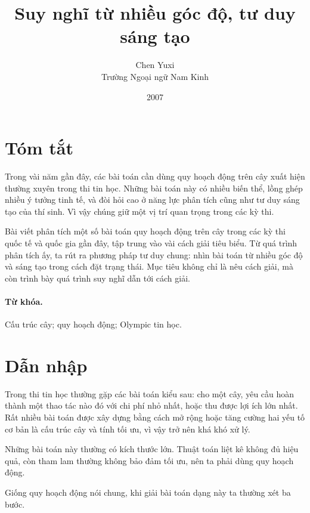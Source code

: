 \documentclass[11pt]{article}
\title{Suy nghĩ từ nhiều góc độ, tư duy sáng tạo}
\author{Chen Yuxi\\Trường Ngoại ngữ Nam Kinh}
\date{2007}
\begin{document}
\maketitle


\section*{Tóm tắt}

Trong vài năm gần đây, các bài toán cần dùng quy hoạch động trên cây xuất
hiện thường xuyên trong thi tin học. Những bài toán này có nhiều biến thể,
lồng ghép nhiều ý tưởng tinh tế, và đòi hỏi cao ở năng lực phân tích cũng như
tư duy sáng tạo của thí sinh. Vì vậy chúng giữ một vị trí quan trọng trong
các kỳ thi.

Bài viết phân tích một số bài toán quy hoạch động trên cây trong các kỳ thi
quốc tế và quốc gia gần đây, tập trung vào vài cách giải tiêu biểu. Từ quá
trình phân tích ấy, ta rút ra phương pháp tư duy chung: nhìn bài toán từ
nhiều góc độ và sáng tạo trong cách đặt trạng thái. Mục tiêu không chỉ là nêu
cách giải, mà còn trình bày quá trình suy nghĩ dẫn tới cách giải.

\paragraph{Từ khóa.}
Cấu trúc cây; quy hoạch động; Olympic tin học.

\section{Dẫn nhập}

Trong thi tin học thường gặp các bài toán kiểu sau: cho một cây, yêu cầu hoàn
thành một thao tác nào đó với chi phí nhỏ nhất, hoặc thu được lợi ích lớn
nhất. Rất nhiều bài toán được xây dựng bằng cách mở rộng hoặc tăng cường hai
yếu tố cơ bản là cấu trúc cây và tính tối ưu, vì vậy trở nên khá khó xử lý.

Những bài toán này thường có kích thước lớn. Thuật toán liệt kê không đủ hiệu
quả, còn tham lam thường không bảo đảm tối ưu, nên ta phải dùng quy hoạch
động.

Giống quy hoạch động nói chung, khi giải bài toán dạng này ta thường xét ba
bước.
\end{document}
